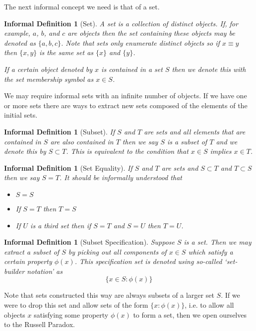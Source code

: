 \documentclass[12pt]{article}
\theoremstyle{break}
\theoremstyle{break}
\theoremstyle{break}
\theoremstyle{break}
\theoremstyle{break}
\newtheorem{informal definition}[definition]{Informal Definition}
\begin{document}
The next informal concept we need is that of a set.
\begin{informal definition}[Set]
A set is a collection of distinct objects.
If, for example, $a$, $b$, and $c$ are objects then the set containing these objects may be denoted as $\{a, b, c\}$.
Note that sets only enumerate \textit{distinct} objects so if $x\equiv y$ then $\{x, y\}$ is the same set as $\{x\}$ and $\{y\}$.

If a certain object denoted by $x$ is contained in a set $S$ then we denote this with the set membership symbol as $x\in S$.
\end{informal definition}
We may require informal sets with an infinite number of objects.
If we have one or more sets there are ways to extract new sets composed of the elements of the initial sets.

\begin{informal definition}[Subset]
If $S$ and $T$ are sets and all elements that are contained in $S$ are also contained in $T$ then we say $S$ is a subset of $T$ and we denote this by $S\subset T$.
This is equivalent to the condition that $x\in S$ implies $x\in T$.
\end{informal definition}

\begin{informal definition}[Set Equality]
If $S$ and $T$ are sets and $S\subset T$ and $T\subset S$ then we say $S=T$.
It should be informally understood that
\begin{itemize}
\item{$S=S$}
\item{If $S=T$ then $T=S$}
\item{If $U$ is a third set then if $S=T$ and $S=U$ then $T=U$.}
\end{itemize}
\end{informal definition}

\begin{informal definition}[Subset Specification]
Suppose $S$ is a set.
Then we may extract a subset of $S$ by picking out all components of $x\in S$ which satisfy a certain property $\phi(x)$.
This specification set is denoted using so-called `set-builder notation' as
$$
\{x\in S: \phi(x)\}
$$
\end{informal definition}

Note that sets constructed this way are always subsets of a larger set $S$.
If we were to drop this set and allow sets of the form $\{x:\phi(x)\}$, i.e. to allow all objects $x$ satisfying some property $\phi(x)$ to form a set, then we open ourselves to the Russell Paradox.
\end{document}
